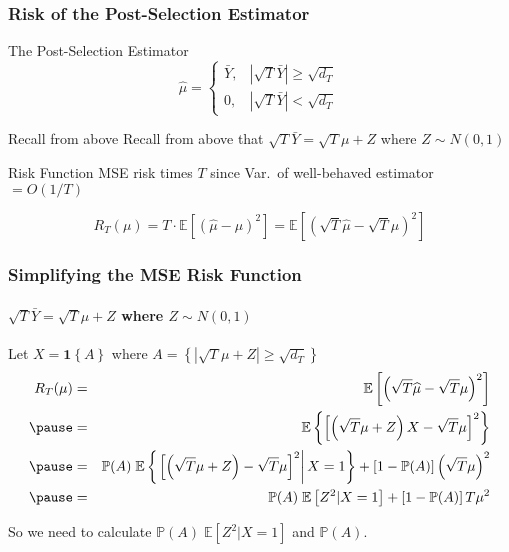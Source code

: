 \begin{frame}
  \frametitle{Risk of the Post-Selection Estimator}
  \begin{block}{The Post-Selection Estimator}
	$$\widehat{\mu}=\left\{\begin{array}
		{cc} \bar{Y}, & |\sqrt{T}\bar{Y} | \geq \sqrt{d_T} \\
		0, & |\sqrt{T}\bar{Y} | < \sqrt{d_T}
		\end{array}\right.$$
  \end{block}

  \pause

  \vspace{-2em}

  \begin{block}{Recall from above}
Recall from above that $\sqrt{T} \bar{Y} = \sqrt{T}\mu +Z$ where $Z\sim N(0,1)$
  \end{block}

  \pause

  \begin{block}{Risk Function}
MSE risk times $T$ since Var.\ of well-behaved estimator $ = O(1/T)$

\[
  R_T(\mu) = T \cdot \mathbb{E}\left[\left( \widehat{\mu} - \mu\right)^2\right] = \mathbb{E}\left[\left(\sqrt{T} \widehat{\mu} - \sqrt{T} \mu\right)^2\right] 
\]
  \end{block}
\end{frame}
\begin{frame}
  \frametitle{Simplifying the MSE Risk Function}
  \framesubtitle{$\sqrt{T} \bar{Y} = \sqrt{T}\mu +Z$ where $Z\sim N(0,1)$}

  \footnotesize

  Let $X = \mathbf{1}\left\{ A \right\}$ where $A = \left\{|\sqrt{T}\mu + Z|\geq \sqrt{d_T}  \right\}$ \pause
  \begin{eqnarray*}
  R_T(\mu) &=& \mathbb{E}\left[\left(\sqrt{T} \widehat{\mu} - \sqrt{T} \mu\right)^2\right] \\ \pause
  &=& \mathbb{E}\left\{ \left[ \left( \sqrt{T}\mu + Z \right)X - \sqrt{T}\mu \right]^2 \right\}\\ \pause
  &=& \mathbb{P}(A)\; \mathbb{E}\left\{ \left.\left[ \left(\sqrt{T}\mu + Z\right) - \sqrt{T}\mu\right]^2\right| X = 1 \right\} + \left[ 1 - \mathbb{P}(A) \right]\left( \sqrt{T}\mu \right)^2\\ \pause
  &=& \mathbb{P}(A)\; \mathbb{E}
  \left[ Z^2 |X = 1 \right] + \left[ 1 - \mathbb{P}(A) \right]T\mu^2
\end{eqnarray*}

\alert{So we need to calculate $\mathbb{P}(A)\; \mathbb{E}[Z^2|X=1]$ and $\mathbb{P}(A)$.}
\end{frame}
